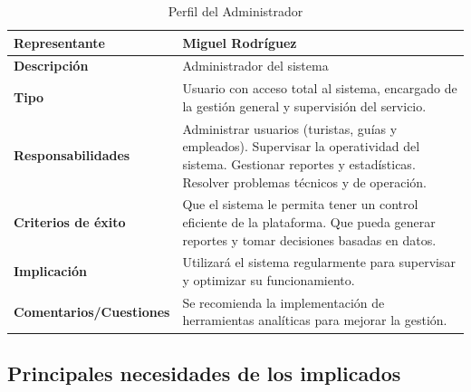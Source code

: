 \begin{table}[H]
\centering
\begin{tabular}{|p{5cm}|p{10cm}|}
\hline
\rowcolor[HTML]{CFE2F3} 
\textbf{Representante} & Miguel Rodríguez \\ \hline
\textbf{Descripción} & Administrador del sistema \\ \hline
\textbf{Tipo} & Usuario con acceso total al sistema, encargado de la gestión general y supervisión del servicio. \\ \hline
\textbf{Responsabilidades} & Administrar usuarios (turistas, guías y empleados). Supervisar la operatividad del sistema. Gestionar reportes y estadísticas. Resolver problemas técnicos y de operación. \\ \hline
\textbf{Criterios de éxito} & Que el sistema le permita tener un control eficiente de la plataforma. Que pueda generar reportes y tomar decisiones basadas en datos. \\ \hline
\textbf{Implicación} & Utilizará el sistema regularmente para supervisar y optimizar su funcionamiento. \\ \hline
\textbf{Comentarios/Cuestiones} & Se recomienda la implementación de herramientas analíticas para mejorar la gestión. \\ \hline
\end{tabular}
\caption{Perfil del Administrador}
\label{tab:perfil_administrador}
\end{table}

\subsection*{Principales necesidades de los implicados}

